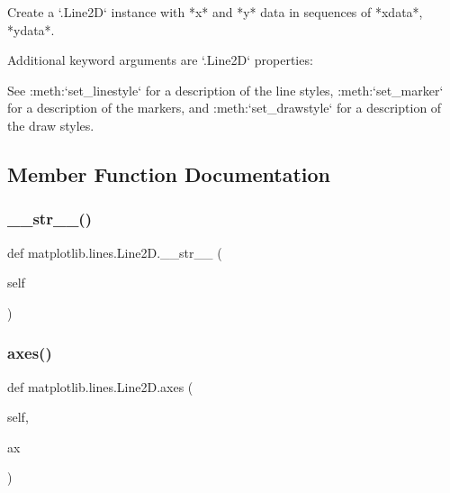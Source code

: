 \begin{DoxyVerb}Create a `.Line2D` instance with *x* and *y* data in sequences of
*xdata*, *ydata*.

Additional keyword arguments are `.Line2D` properties:


See :meth:`set_linestyle` for a description of the line styles,
:meth:`set_marker` for a description of the markers, and
:meth:`set_drawstyle` for a description of the draw styles.\end{DoxyVerb}
 

\subsection{Member Function Documentation}
\mbox{\label{classmatplotlib_1_1lines_1_1Line2D_af5474a0851ed0ef333ca732b21c26f3e}} 
\subsubsection{\texorpdfstring{\+\_\+\+\_\+str\+\_\+\+\_\+()}{\_\_str\_\_()}}
{\footnotesize\ttfamily def matplotlib.\+lines.\+Line2\+D.\+\_\+\+\_\+str\+\_\+\+\_\+ (\begin{DoxyParamCaption}\item[{}]{self }\end{DoxyParamCaption})}

\mbox{\label{classmatplotlib_1_1lines_1_1Line2D_a493458ea1459a739b91071ce87c0fdc1}} 
\subsubsection{\texorpdfstring{axes()}{axes()}}
{\footnotesize\ttfamily def matplotlib.\+lines.\+Line2\+D.\+axes (\begin{DoxyParamCaption}\item[{}]{self,  }\item[{}]{ax }\end{DoxyParamCaption})}

